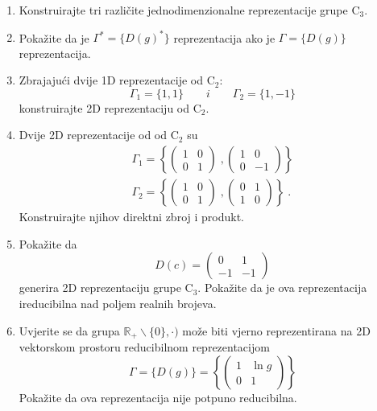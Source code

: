 \begin{enumerate}[label=\arabic{chapter}.\arabic*.]

\item Konstruirajte tri različite jednodimenzionalne reprezentacije
grupe C$_3$.

\item Pokažite da je $\Gamma^* = \{ D(g)^* \}$ reprezentacija ako je
                     $\Gamma   = \{ D(g)   \}$ reprezentacija.

\item Zbrajajući dvije 1D reprezentacije od C$_2$:
\begin{equation}
 \Gamma_1 = \{1, 1\} \qquad i \qquad \Gamma_2 = \{1, -1\}
\end{equation}
konstruirajte 2D reprezentaciju od C$_2$.

\item Dvije 2D reprezentacije od od C$_2$ su
\begin{align*}
\Gamma_1 = \left\{
\begin{pmatrix}
 1 & 0 \\ 0 & 1
\end{pmatrix}\;,
\begin{pmatrix}
 1 & 0 \\ 0 & -1
\end{pmatrix}\right\} \\
\Gamma_2 = \left\{
\begin{pmatrix}
 1 & 0 \\ 0 & 1
\end{pmatrix}\;,
\begin{pmatrix}
 0 & 1 \\ 1 & 0
\end{pmatrix}\right\}\;.
\end{align*}
Konstruirajte njihov direktni zbroj i produkt.

\item Pokažite da
\begin{equation*}
 D(c) = 
\begin{pmatrix}
0 & 1 \\
-1 & -1
\end{pmatrix}
\end{equation*}
generira 2D reprezentaciju grupe C$_3$. Pokažite da je ova reprezentacija
ireducibilna nad poljem realnih brojeva.

\item \label{zad:lnred} Uvjerite se da grupa $\mathbb{R}_{+}\backslash \{0\}, \cdot )$
može biti vjerno reprezentirana na 2D vektorskom prostoru reducibilnom
reprezentacijom
\begin{equation*}
\Gamma = \{ D(g) \} = \left\{
\begin{pmatrix}
1 & \ln g  \\
0 & 1
\end{pmatrix}\right\}
\end{equation*}
Pokažite da ova reprezentacija nije potpuno reducibilna.


\end{enumerate}
